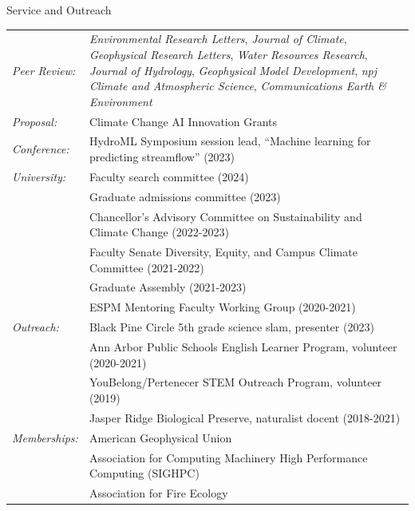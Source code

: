 \documentclass{cv}
\begin{document}
\begin{cSection}{Service and Outreach}
\renewcommand{\arraystretch}{1.2}
\vspace{1.6em}
\begin{tabularx}{.98\textwidth}{l X}
\textit{Peer Review:} &  \textit{Environmental Research Letters}, \textit{Journal of Climate}, \textit{Geophysical Research Letters}, \textit{Water Resources Research}, \textit{Journal of Hydrology}, \textit{Geophysical Model Development}, \textit{npj Climate and Atmospheric Science}, \textit{Communications Earth \& Environment}\\
\textit{Proposal:} & Climate Change AI Innovation Grants \\
\textit{Conference:} & HydroML Symposium session lead, ``Machine learning for predicting streamflow'' (2023)\\
\textit{University:} 
& Faculty search committee (2024) \\ 
& Graduate admissions committee (2023) \\
 & Chancellor's Advisory Committee on Sustainability and Climate Change (2022-2023) \\
 & Faculty Senate Diversity, Equity, and Campus Climate Committee (2021-2022)\\
 & Graduate Assembly (2021-2023) \\
& ESPM Mentoring Faculty Working Group (2020-2021)\\
\textit{Outreach: } & Black Pine Circle 5th grade science slam, presenter (2023) \\
& Ann Arbor Public Schools English Learner Program, volunteer (2020-2021)\\
& YouBelong/Pertenecer STEM Outreach Program, volunteer (2019)\\
& Jasper Ridge Biological Preserve, naturalist docent (2018-2021)\\
 \textit{Memberships:} &American Geophysical Union \\
& Association for Computing Machinery High Performance Computing (SIGHPC) \\
& Association for Fire Ecology\\
\end{tabularx}
\end{cSection}
\end{document}

